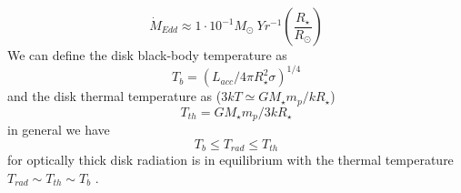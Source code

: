 \documentclass[a4paper,12pt,modern]{aastex62}
\begin{document}
\begin{equation}
\dot M_{Edd} \approx 1\cdot10^{-1} M_\odot ~Yr^{-1} \left( \frac{R_\star}{R_\odot} \right)
\end{equation}
We can define the disk black-body temperature as
\begin{equation}
T_b=(L_{acc}/4\pi R_\star^2 \sigma)^{1/4}
\end{equation}
and the disk thermal temperature as ($3kT\simeq GM_\star m_p / k R_\star$)
\begin{equation}
T_{th}=GM_\star m_p /3 k R_\star
\end{equation}
in general we have
\begin{equation}
T_b \leq T_{rad} \leq T_{th}
\end{equation}
for optically thick disk radiation is in equilibrium with the thermal temperature $T_{rad}\sim T_{th} \sim T_b$ .
\end{document}
